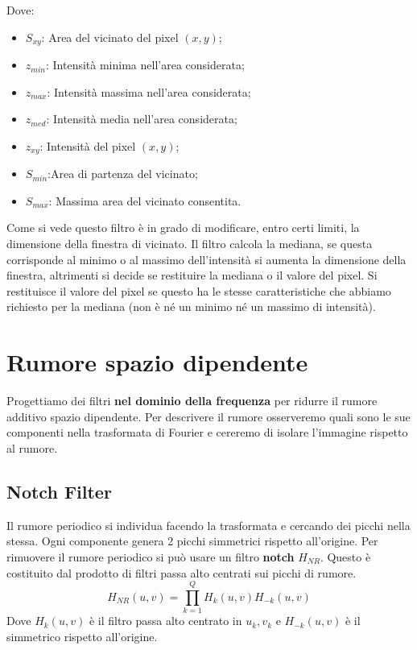 Dove:
\begin{itemize}
	\item $S_{xy}$: Area del vicinato del pixel $(x,y)$;
	\item $z_{min}$: Intensità minima nell'area considerata;
	\item $z_{max}$: Intensità massima nell'area considerata;
	\item $z_{med}$: Intensità media nell'area considerata;
	\item $z_{xy}$: Intensità del pixel $(x,y)$;
	\item $S_{min}$:Area di partenza del vicinato;
	\item $S_{max}$: Massima area del vicinato consentita.
\end{itemize}

Come si vede questo filtro è in grado di modificare, entro certi limiti, la dimensione della finestra di vicinato. Il filtro calcola la mediana, se questa corrisponde al minimo o al massimo dell'intensità si aumenta la dimensione della finestra, altrimenti si decide se restituire la mediana o il valore del pixel. Si restituisce il valore del pixel se questo ha le stesse caratteristiche che abbiamo richiesto per la mediana (non è né un minimo né un massimo di intensità).

\section{Rumore spazio dipendente}
Progettiamo dei filtri \textbf{nel dominio della frequenza} per ridurre il rumore additivo spazio dipendente.
Per descrivere il rumore osserveremo quali sono le sue componenti nella trasformata di Fourier e cereremo di isolare l'immagine rispetto al rumore.

\subsection{Notch Filter}
Il rumore periodico si individua facendo la trasformata e cercando dei picchi nella stessa. Ogni componente genera 2 picchi simmetrici rispetto all'origine. Per rimuovere il rumore periodico si può usare un filtro \textbf{notch} $H_{NR}$. Questo è costituito dal prodotto di filtri passa alto centrati sui picchi di rumore.
\begin{equation}
	H_{NR}(u,v) = \prod_{k=1}^{Q} H_k(u,v) H_{-k}(u,v)
\end{equation}
Dove $ H_k(u,v)$ è il filtro passa alto centrato in $u_k,v_k$ e $H_{-k}(u,v)$ è il simmetrico rispetto all'origine.

